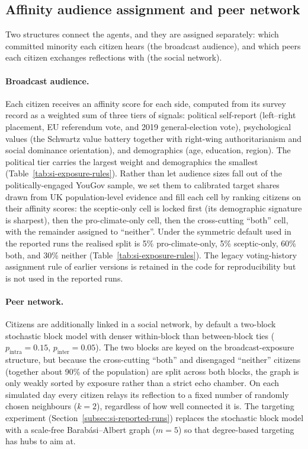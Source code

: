 \documentclass[pdflatex,sn-mathphys-num]{sn-jnl}%
\theoremstyle{thmstyleone}%
\theoremstyle{thmstyletwo}%
\theoremstyle{thmstylethree}%
\begin{document}
\subsection{Affinity audience assignment and peer network}\label{subsec:si-structure}

Two structures connect the agents, and they are assigned separately: which
committed minority each citizen hears (the broadcast audience), and which peers each
citizen exchanges reflections with (the social network).

\paragraph{Broadcast audience.}
Each citizen receives an affinity score for each side, computed from its survey
record as a weighted sum of three tiers of signals: political self-report
(left--right placement, EU referendum vote, and 2019 general-election vote),
psychological values (the Schwartz value battery together with right-wing
authoritarianism and social dominance orientation), and demographics (age,
education, region). The political tier carries the largest weight and demographics
the smallest (Table~\ref{tab:si-exposure-rules}). Rather than let audience sizes
fall out of the politically-engaged YouGov sample, we set them to calibrated target
shares drawn from UK population-level evidence and fill each cell by ranking
citizens on their affinity scores: the sceptic-only cell is locked first (its
demographic signature is sharpest), then the pro-climate-only cell, then the
cross-cutting ``both'' cell, with the remainder assigned to ``neither''. Under the
symmetric default used in the reported runs the realised split is 5\%
pro-climate-only, 5\% sceptic-only, 60\% both, and 30\% neither
(Table~\ref{tab:si-exposure-rules}). The legacy voting-history assignment rule of
earlier versions is retained in the code for reproducibility but is not used in the
reported runs.

\paragraph{Peer network.}
Citizens are additionally linked in a social network, by default a two-block
stochastic block model with denser within-block than between-block ties
($p_{\mathrm{intra}}=0.15$, $p_{\mathrm{inter}}=0.05$). The two blocks are keyed on
the broadcast-exposure structure, but because the cross-cutting ``both'' and
disengaged ``neither'' citizens (together about 90\% of the population) are split
across both blocks, the graph is only weakly sorted by exposure rather than a
strict echo chamber. On each simulated day every citizen relays its reflection to a
fixed number of randomly chosen neighbours ($k=2$), regardless of how well
connected it is. The targeting experiment (Section~\ref{subsec:si-reported-runs})
replaces the stochastic block model with a scale-free Barab\'asi--Albert graph
($m=5$) so that degree-based targeting has hubs to aim at.
\end{document}
